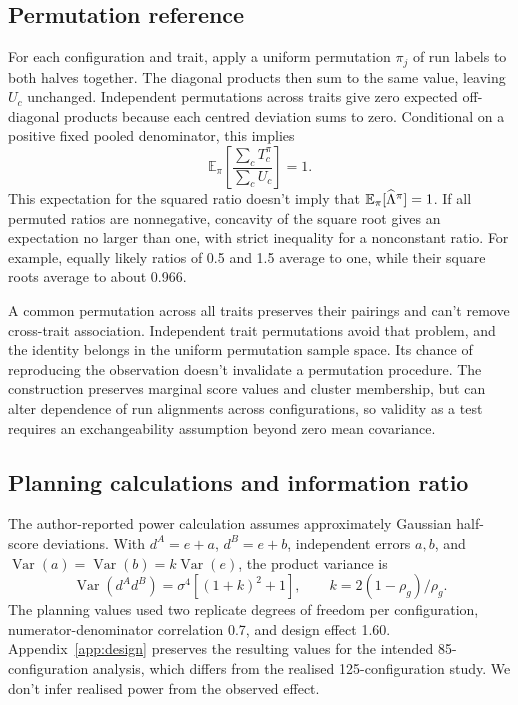 \subsection{Permutation reference}
For each configuration and trait, apply a uniform permutation $\pi_j$ of run labels to both halves together. The diagonal products then sum to the same value, leaving $U_c$ unchanged. Independent permutations across traits give zero expected off-diagonal products because each centred deviation sums to zero. Conditional on a positive fixed pooled denominator, this implies
\begin{equation}
\mathbb E_\pi\left[\frac{\sum_cT_c^\pi}{\sum_cU_c}\right]=1.
\end{equation}
This expectation for the squared ratio doesn't imply that $\mathbb E_\pi[\widehat{\Lambda}^\pi]=1$. If all permuted ratios are nonnegative, concavity of the square root gives an expectation no larger than one, with strict inequality for a nonconstant ratio. For example, equally likely ratios of 0.5 and 1.5 average to one, while their square roots average to about 0.966.

A common permutation across all traits preserves their pairings and can't remove cross-trait association. Independent trait permutations avoid that problem, and the identity belongs in the uniform permutation sample space. Its chance of reproducing the observation doesn't invalidate a permutation procedure. The construction preserves marginal score values and cluster membership, but can alter dependence of run alignments across configurations, so validity as a test requires an exchangeability assumption beyond zero mean covariance.

\subsection{Planning calculations and information ratio}
The author-reported power calculation assumes approximately Gaussian half-score deviations. With $d^A=e+a$, $d^B=e+b$, independent errors $a,b$, and $\operatorname{Var}(a)=\operatorname{Var}(b)=k\operatorname{Var}(e)$, the product variance is
\begin{equation}
\operatorname{Var}(d^Ad^B)=\sigma^4[(1+k)^2+1],\qquad
k=2(1-\rho_g)/\rho_g.
\end{equation}
The planning values used two replicate degrees of freedom per configuration, numerator-denominator correlation 0.7, and design effect 1.60. Appendix~\ref{app:design} preserves the resulting values for the intended 85-configuration analysis, which differs from the realised 125-configuration study. We don't infer realised power from the observed effect.


